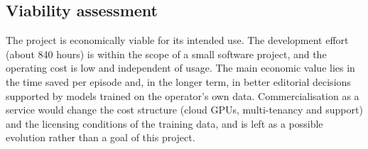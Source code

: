 \subsection*{Viability assessment}

The project is economically viable for its intended use. The development effort (about 840 hours) is within the scope of a small software project, and the operating cost is low and independent of usage. The main economic value lies in the time saved per episode and, in the longer term, in better editorial decisions supported by models trained on the operator's own data. Commercialisation as a service would change the cost structure (cloud GPUs, multi-tenancy and support) and the licensing conditions of the training data, and is left as a possible evolution rather than a goal of this project.
